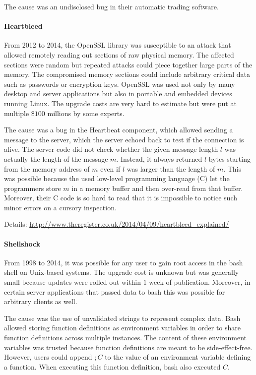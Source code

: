 The cause was an undisclosed bug in their automatic trading software.

\paragraph{Heartbleed}
From 2012 to 2014, the OpenSSL library was susceptible to an attack that allowed remotely reading out sections of raw physical memory.
The affected sections were random but repeated attacks could piece together large parts of the memory.
The compromised memory sections could include arbitrary critical data such as passwords or encryption keys.
OpenSSL was used not only by many desktop and server applications but also in portable and embedded devices running Linux.
The upgrade costs are very hard to estimate but were put at multiple \$$100$ millions by some experts.

The cause was a bug in the Heartbeat component, which allowed sending a message to the server, which the server echoed back to test if the connection is alive.
The server code did not check whether the given message length $l$ was actually the length of the message $m$.
Instead, it always returned $l$ bytes starting from the memory address of $m$ even if $l$ was larger than the length of $m$.
This was possible because the used low-level programming language (C) let the programmers store $m$ in a memory buffer and then over-read from that buffer.
Moreover, their C code is so hard to read that it is impossible to notice such minor errors on a cursory inspection.

Details: \url{http://www.theregister.co.uk/2014/04/09/heartbleed_explained/}

\paragraph{Shellshock}
From 1998 to 2014, it was possible for any user to gain root access in the bash shell on Unix-based systems.
The upgrade cost is unknown but was generally small because updates were rolled out within $1$ week of publication.
Moreover, in certain server applications that passed data to bash this was possible for arbitrary clients as well.

The cause was the use of unvalidated strings to represent complex data.
Bash allowed storing function definitions as environment variables in order to share function definitions across multiple instances.
The content of these environment variables was trusted because function definitions are meant to be side-effect-free.
However, users could append $; C$ to the value of an environment variable defining a function.
When executing this function definition, bash also executed $C$.

